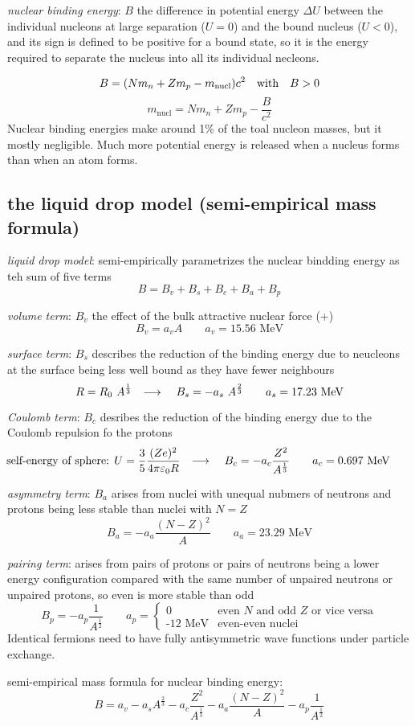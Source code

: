 \documentclass[10pt, a4paper, twocolumn]{article}
\newcommand{\deff}[1]{\par \noindent \textit{#1}: }
\newcommand{\arr}{\ensuremath{\longrightarrow\ }}
\newcommand{\eps}{\ensuremath{\varepsilon _0}}
\begin{document}
\deff{nuclear binding energy} $B$ the difference in potential energy $\Delta U$ between the individual nucleons at large separation ($U=0$) and the bound nucleus ($U<0$), and its sign is defined to be positive for a bound state, so it is the energy required to separate the nucleus into all its individual necleons.

\[B = (Nm_n+Zm_p-m_\text{nucl})c^2 \qq{with} B>0 \]
\[m_\text{nucl} = Nm_n+Zm_p-\frac{B}{c^2} \]
Nuclear binding energies make around 1\% of the toal nucleon masses, but it mostly negligible. Much more potential energy is released when a nucleus forms than when an atom forms.

\subsection{the liquid drop model
(semi-empirical mass formula)}

\deff{liquid drop model} semi-empirically parametrizes the nuclear bindding energy as teh sum of five terms
\[B=B_v+B_s+B_c+B_a+B_p\]
\deff{volume term} $B_v$ the effect of the bulk attractive nuclear force (+)
\[B_v=a_vA \qquad a_v = 15.56\text{ MeV} \]
\deff{surface term} $B_s$ describes the reduction of the binding energy due to neucleons at the surface being less well bound as they have fewer neighbours
\[R=R_0\ A^\frac13 \qq{\arr} B_s = -a_s\ A^\frac23
\qquad a_s=17.23\text{ MeV} \]
\deff{Coulomb term} $B_c$ desribes the reduction of the binding energy due to the Coulomb repulsion fo the protons
\[\hspace{-2em} \text{self-energy of sphere: }
U=\frac35\frac{(Ze)^2}{4\pi\eps R}
\qq{\arr} B_c=-a_c\frac{Z^2}{A^\frac13}
\qquad a_c=0.697\text{ MeV} \]
\deff{asymmetry term} $B_a$ arises from nuclei with unequal nubmers of neutrons and protons being less stable than nuclei with $N=Z$
\[B_a=-a_a\frac{(N-Z)^2}{A} \qquad a_a=23.29\text{ MeV}\]
\deff{pairing term} arises from pairs of protons or pairs of neutrons being a lower energy configuration compared with the same number of unpaired neutrons or unpaired protons, so even is more stable than odd
\[B_p=-a_p\frac{1}{A^\frac12}
\qquad a_p=\begin{cases}
0 & \text{even $N$ and odd $Z$ or vice versa}
\\ \text{-12 MeV} & \text{even-even nuclei} \end{cases} \]
Identical fermions need to have fully antisymmetric wave functions under particle exchange.

semi-empirical mass formula for nuclear binding energy:
\[B=a_v-a_sA^\frac23-a_c\frac{Z^2}{A^\frac13}
-a_a\frac{(N-Z)^2}{A}-a_p\frac{1}{A^\frac12} \]
\end{document}
